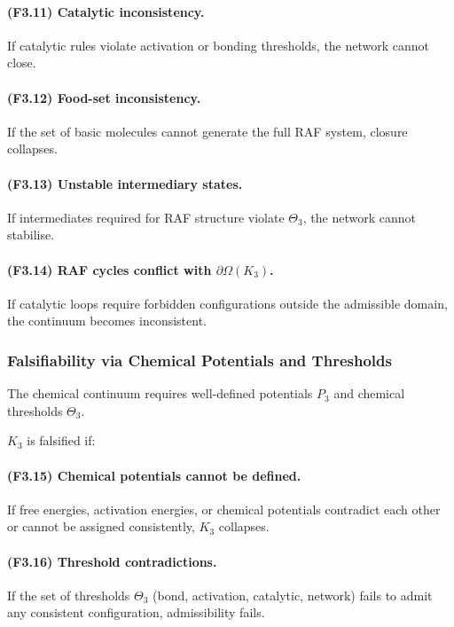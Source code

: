 \paragraph{(F3.11) Catalytic inconsistency.}
If catalytic rules violate activation or bonding thresholds, the network
cannot close.

\paragraph{(F3.12) Food-set inconsistency.}
If the set of basic molecules cannot generate the full RAF system,
closure collapses.

\paragraph{(F3.13) Unstable intermediary states.}
If intermediates required for RAF structure violate $\Theta_3$, the
network cannot stabilise.

\paragraph{(F3.14) RAF cycles conflict with \texorpdfstring{$\partial\Omega(K_3)$}{\partial\Omega(K_3)}.}
If catalytic loops require forbidden configurations outside the
admissible domain, the continuum becomes inconsistent.



\subsubsection{Falsifiability via Chemical Potentials and Thresholds}

The chemical continuum requires well-defined potentials $P_3$ and
chemical thresholds $\Theta_3$.

$K_3$ is falsified if:

\paragraph{(F3.15) Chemical potentials cannot be defined.}
If free energies, activation energies, or chemical potentials contradict
each other or cannot be assigned consistently, $K_3$ collapses.

\paragraph{(F3.16) Threshold contradictions.}
If the set of thresholds $\Theta_3$ (bond, activation, catalytic,
network) fails to admit any consistent configuration, admissibility
fails.

